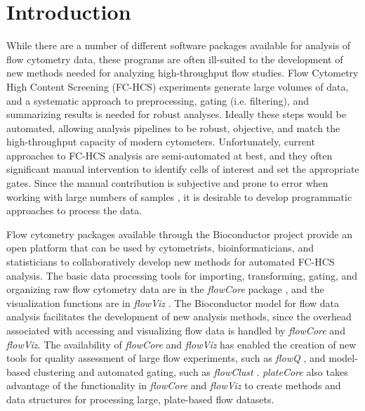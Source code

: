 \documentclass[12pt]{article}
\newcommand{\Rpackage}[1]{{\textit{#1}}}
\begin{document}
\clearpage
\section*{Introduction}

While there are a number of different software packages available for analysis of flow cytometry data, these programs are often
ill-suited to the development of new methods needed for analyzing high-throughput flow studies.
Flow Cytometry High Content Screening (FC-HCS) experiments generate large volumes of data, and a systematic approach to
preprocessing, gating (i.e. filtering), and summarizing results is needed for robust analyses. 
Ideally these steps would be automated,
allowing analysis pipelines to be robust, objective, and match the high-throughput capacity of modern cytometers. 
Unfortunately, current approaches to FC-HCS analysis are semi-automated at best,
and they often significant manual intervention to identify cells of interest and set the appropriate gates. 
Since the manual contribution is subjective and prone to error when working with large numbers of samples \citep{Maecker2005},
it is desirable to develop programmatic approaches to process the data.

Flow cytometry packages available through the Bioconductor \citep{BIOC} project provide an open platform that
can be used by cytometrists, bioinformaticians, and statisticians to collaboratively develop new methods for
automated FC-HCS analysis.  The basic data processing tools for importing, transforming, gating, and
organizing raw flow cytometry data are in the \Rpackage{flowCore} package \citep{hahne2009}, and the visualization functions are
in \Rpackage{flowViz} \citep{sarkar2008ufv}. The Bioconductor model for flow data analysis facilitates
the development of new analysis methods, since the overhead associated with
accessing and visualizing flow data is handled by \Rpackage{flowCore} and \Rpackage{flowViz}.
The availability of \Rpackage{flowCore} and \Rpackage{flowViz} has enabled the creation of new tools for
quality assessment of large flow experiments, such as \Rpackage{flowQ} \citep{lemeurFQ}, and model-based clustering and automated
gating, such as \Rpackage{flowClust} \citep{lo2008}.
\Rpackage{plateCore} also takes advantage of the functionality in \Rpackage{flowCore} and \Rpackage{flowViz}
to create methods and data structures for processing large, plate-based flow datasets.  
\end{document}
